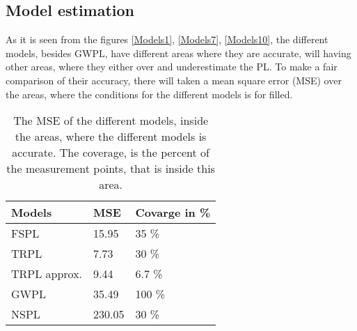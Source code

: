 \subsection{Model estimation}

As it is seen from the figures \autoref{Models1}, \autoref{Models7}, \autoref{Models10}, the different models, besides GWPL, have different areas where they are accurate, will having other areas, where they either over and underestimate the PL. To make a fair comparison of their accuracy, there will taken a mean square error (MSE) over the areas, where the conditions for the different models is for filled.







\begin{table}[!htbp]
\centering
\begin{tabular}{|l|l|l|}
\hline
\textbf{Models} & \textbf{MSE} & \textbf{Covarge in \%} \\ \hline
FSPL            & 15.95        & 35 \%                  \\ \hline
TRPL            & 7.73         & 30 \%                  \\ \hline
TRPL approx.    & 9.44         & 6.7 \%                 \\ \hline
GWPL            & 35.49        & 100 \%                 \\ \hline
NSPL            & 230.05       & 30 \%                  \\ \hline
\end{tabular}
\caption{The MSE of the different models, inside the areas, where the different models is accurate. The coverage, is the percent of the measurement points, that is inside this area.}
\label{my-label}
\end{table}






